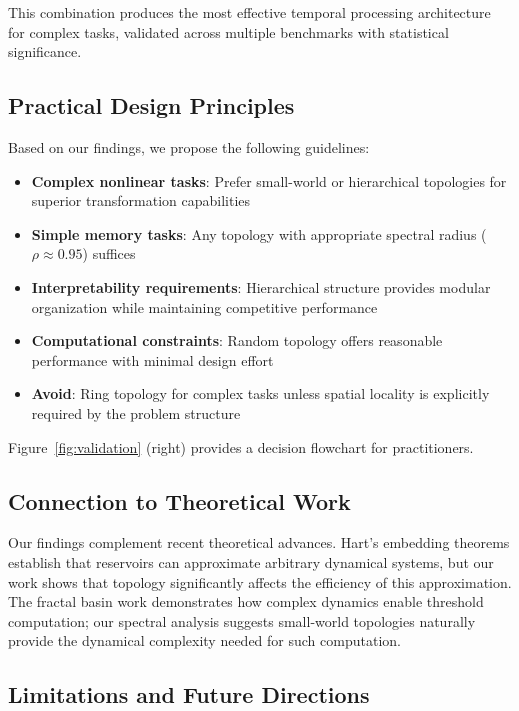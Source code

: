 \documentclass{article}
\begin{document}
This combination produces the most effective temporal processing architecture for complex tasks, validated across multiple benchmarks with statistical significance.

\subsection{Practical Design Principles}

Based on our findings, we propose the following guidelines:

\begin{itemize}
\item \textbf{Complex nonlinear tasks}: Prefer small-world or hierarchical topologies for superior transformation capabilities
\item \textbf{Simple memory tasks}: Any topology with appropriate spectral radius ($\rho \approx 0.95$) suffices
\item \textbf{Interpretability requirements}: Hierarchical structure provides modular organization while maintaining competitive performance
\item \textbf{Computational constraints}: Random topology offers reasonable performance with minimal design effort
\item \textbf{Avoid}: Ring topology for complex tasks unless spatial locality is explicitly required by the problem structure
\end{itemize}

Figure~\ref{fig:validation} (right) provides a decision flowchart for practitioners.

\subsection{Connection to Theoretical Work}

Our findings complement recent theoretical advances. Hart's embedding theorems \cite{hart2022spatial} establish that reservoirs can approximate arbitrary dynamical systems, but our work shows that topology significantly affects the efficiency of this approximation. The fractal basin work \cite{hart2024fractal} demonstrates how complex dynamics enable threshold computation; our spectral analysis suggests small-world topologies naturally provide the dynamical complexity needed for such computation.

\subsection{Limitations and Future Directions}
\end{document}
